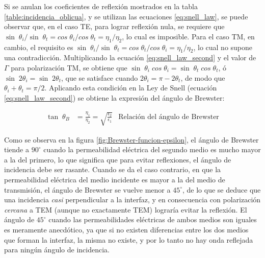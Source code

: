 Si se anulan los coeficientes de reflexión mostrados en la tabla \ref{table:incidencia_oblicua}, y se utilizan las ecuaciones \ref{eq:snell_law}, se puede observar que, en el caso TE, para lograr reflexión nula, se requiere que $\sin \; \theta_i / \sin \; \theta_t = cos \; \theta_i / cos \; \theta_t = \eta_1 / \eta_2$, lo cual es imposible. Para el caso TM, en cambio, el requisito es $\sin \; \theta_i / \sin \; \theta_t = cos \; \theta_t / cos \; \theta_i = \eta_1 / \eta_2$, lo cual no supone una contradicción. Multiplicando la ecuación \ref{eq:snell_law_second} y el valor de $\Gamma$ para polarización TM, se obtiene que $\sin\;\theta_i \; cos \; \theta_i = \sin \; \theta_t \; cos \; \theta_t$, ó $\sin \; 2\theta_i = \sin \; 2\theta_t$, que se satisface cuando $2\theta_i = \pi - 2\theta_t$, de modo que $\theta_i + \theta_t = \pi/2$. Aplicando esta condición en la Ley de Snell (ecuación \ref{eq:snell_law_second}) se obtiene la expresión del ángulo de Brewster:


\begin{align}
	\label{eq:Brewster_angle}
	\tan\;\theta_B &= \frac{\eta_1}{\eta_2} = \sqrt{\frac{\epsilon_2}{\epsilon_1}} & \text{Relación del ángulo de Brewster}
\end{align}

Como se observa en la figura \ref{fig:Brewster-funcion-epsilon}, el ángulo de Brewster tiende a $90^{\circ}$ cuando la permeabilidad eléctrica del segundo medio es mucho mayor a la del primero, lo que significa que para evitar reflexiones, el ángulo de incidencia debe ser rasante. Cuando se da el caso contrario, en que la permeabilidad eléctrica del medio incidente es mayor a la del medio de transmisión, el ángulo de Brewster se vuelve menor a $45^{\circ}$, de lo que se deduce que una incidencia \textit{casi} perpendicular a la interfaz, y en consecuencia con polarización \textit{cercana} a TEM (aunque no exactamente TEM) lograría evitar la reflexión. El ángulo de $45^{\circ}$ cuando las permeabilidades eléctricas de ambos medios son iguales es meramente anecdótico, ya que si no existen diferencias entre los dos medios que forman la interfaz, la misma no existe, y por lo tanto no hay onda reflejada para ningún ángulo de incidencia.

\begin{figure} [H]
	\centering 
	\caption{}
	\label{fig:angulo-critico-epsilon}
\end{figure}

